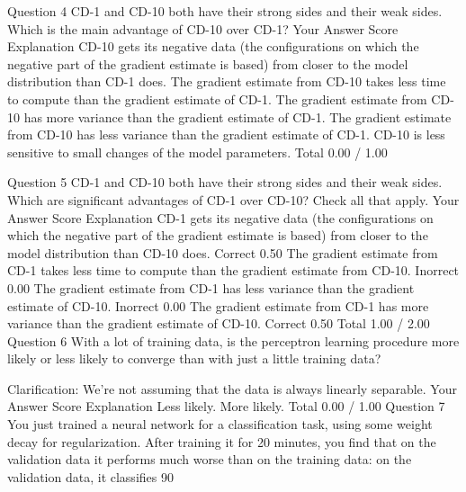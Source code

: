 Question 4
CD-1 and CD-10 both have their strong sides and their weak sides. Which is the main advantage of CD-10 over CD-1?
Your Answer		Score	Explanation
CD-10 gets its negative data (the configurations on which the negative part of the gradient estimate is based) from closer to the model distribution than CD-1 does.			
The gradient estimate from CD-10 takes less time to compute than the gradient estimate of CD-1.			
The gradient estimate from CD-10 has more variance than the gradient estimate of CD-1.			
The gradient estimate from CD-10 has less variance than the gradient estimate of CD-1.			
CD-10 is less sensitive to small changes of the model parameters.			
Total		0.00 / 1.00	

Question 5
CD-1 and CD-10 both have their strong sides and their weak sides. Which are significant advantages of CD-1 over CD-10? Check all that apply.
Your Answer		Score	Explanation
CD-1 gets its negative data (the configurations on which the negative part of the gradient estimate is based) from closer to the model distribution than CD-10 does.	Correct	0.50	
The gradient estimate from CD-1 takes less time to compute than the gradient estimate from CD-10.	Inorrect	0.00	
The gradient estimate from CD-1 has less variance than the gradient estimate of CD-10.	Inorrect	0.00	
The gradient estimate from CD-1 has more variance than the gradient estimate of CD-10.	Correct	0.50	
Total		1.00 / 2.00	
Question 6
With a lot of training data, is the perceptron learning procedure more likely or less likely to converge than with just a little training data?

Clarification: We're not assuming that the data is always linearly separable.
Your Answer		Score	Explanation
Less likely.			
More likely.			
Total		0.00 / 1.00	
Question 7
You just trained a neural network for a classification task, using some weight decay for regularization. After training it for 20 minutes, you find that on the validation data it performs much worse than on the training data: on the validation data, it classifies 90%

